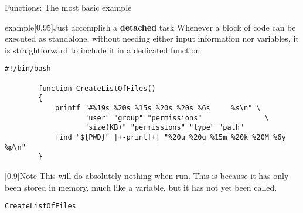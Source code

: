 \begin{frame}[fragile]{Functions: The most basic example}
    \vspace{-5mm}
    \begin{varblock}{example}[0.95\textwidth]{Just accomplish a \textbf{detached} task}
        Whenever a block of code can be executed as standalone, without needing either input information nor variables, it is straightforward to include it in a dedicated function
    \end{varblock}
    \begin{lstlisting}[style=MyBash, xrightmargin=1mm, xleftmargin=1mm]
        #!/bin/bash
        
        function CreateListOfFiles()
        {
            printf "#%19s %20s %15s %20s %20s %6s     %s\n" \
                   "user" "group" "permissions"               \
                   "size(KB)" "permissions" "type" "path"
            find "${PWD}" |+-printf+| "%20u %20g %15m %20k %20M %6y     %p\n"
        }
    \end{lstlisting}
    \begin{varblock}{}[0.9\textwidth]{Note}
        This will do absolutely nothing when run. This is because it has only been stored in memory, much like a variable, but it has not yet been called.
    \end{varblock}
    \begin{lstlisting}[style=MyBash, firstnumber=10, xrightmargin=1mm, xleftmargin=1mm]
        CreateListOfFiles
    \end{lstlisting}
\end{frame}
